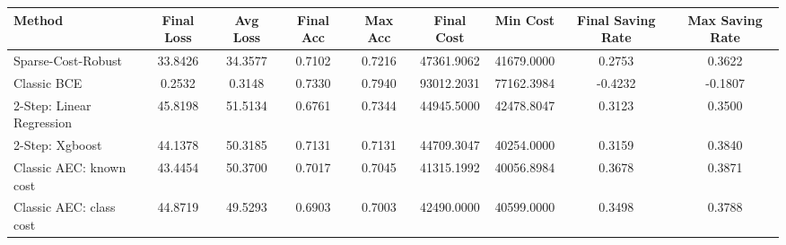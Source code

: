 \begin{tabular}{lcccccccc}
\toprule
Method & Final Loss & Avg Loss & Final Acc & Max Acc & Final Cost & Min Cost & Final Saving Rate & Max Saving Rate \\
\midrule
Sparse-Cost-Robust & 33.8426 & 34.3577 & 0.7102 & 0.7216 & 47361.9062 & 41679.0000 & 0.2753 & 0.3622 \\
Classic BCE & 0.2532 & 0.3148 & 0.7330 & 0.7940 & 93012.2031 & 77162.3984 & -0.4232 & -0.1807 \\
2-Step: Linear Regression & 45.8198 & 51.5134 & 0.6761 & 0.7344 & 44945.5000 & 42478.8047 & 0.3123 & 0.3500 \\
2-Step: Xgboost & 44.1378 & 50.3185 & 0.7131 & 0.7131 & 44709.3047 & 40254.0000 & 0.3159 & 0.3840 \\
Classic AEC: known cost & 43.4454 & 50.3700 & 0.7017 & 0.7045 & 41315.1992 & 40056.8984 & 0.3678 & 0.3871 \\
Classic AEC: class cost & 44.8719 & 49.5293 & 0.6903 & 0.7003 & 42490.0000 & 40599.0000 & 0.3498 & 0.3788 \\
\bottomrule
\end{tabular}
